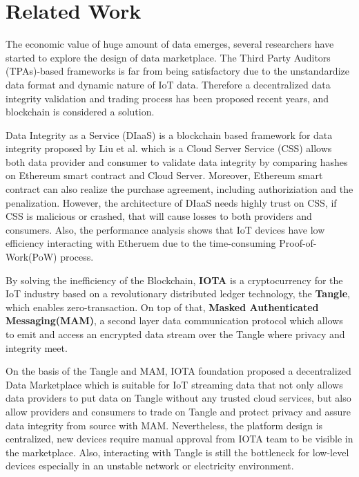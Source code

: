 \documentclass[journal,10pt,a4paper]{IEEEtran}
\begin{document}
\section{\normalsize\textbf{Related Work}}
The economic value of huge amount of data emerges, several researchers have started to explore the design of data marketplace. The Third Party Auditors (TPAs)-based frameworks is far from being satisfactory due to the unstandardize data format and dynamic nature of IoT data. Therefore a decentralized data integrity validation and trading process has been proposed recent years, and blockchain is considered a solution.

Data Integrity as a Service (DIaaS) is a blockchain based framework for data integrity proposed by Liu et al.\cite{DIaas} which is a Cloud Server Service (CSS) allows both data provider and consumer to validate data integrity by comparing hashes on Ethereum smart contract and Cloud Server. Moreover, Ethereum smart contract can also realize the purchase agreement, including authoriziation and the penalization. However, the architecture of DIaaS needs highly trust on CSS, if CSS is malicious or crashed, that will cause losses to both providers and consumers. Also, the performance analysis shows that IoT devices have low efficiency interacting with Etheruem due to the time-consuming Proof-of-Work(PoW) process.

By solving the inefficiency of the Blockchain, \textbf{IOTA}\cite{IOTAwhitepaper} is a cryptocurrency for the IoT industry based on a revolutionary distributed ledger technology, the \textbf{Tangle}, which enables zero-transaction. On top of that, \textbf{Masked Authenticated Messaging(MAM)}\cite{MAM}, a second layer data communication protocol which allows to emit and access an encrypted data stream over the Tangle where privacy and integrity meet.

On the basis of the Tangle and MAM, IOTA foundation proposed a decentralized Data Marketplace\cite{IOTADataMarket} which is suitable for IoT streaming data that not only allows data providers to put data on Tangle without any trusted cloud services, but also allow providers and consumers to trade on Tangle and protect privacy and assure data integrity from source with MAM. Nevertheless, the platform design is centralized, new devices require manual approval from IOTA team to be visible in the marketplace. Also, interacting with Tangle is still the bottleneck for low-level devices especially in an unstable network or electricity environment.
\end{document}
